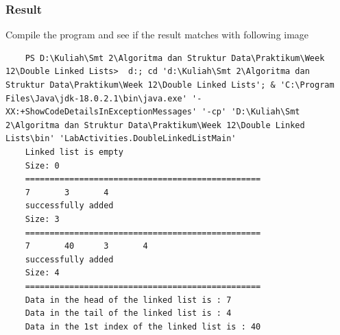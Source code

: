 \documentclass[12pt,titlepage]{article}
\begin{document}
\subsubsection{Result}
Compile the program and see if the result matches with following image
\begin{verbatim}
    PS D:\Kuliah\Smt 2\Algoritma dan Struktur Data\Praktikum\Week 12\Double Linked Lists>  d:; cd 'd:\Kuliah\Smt 2\Algoritma dan Struktur Data\Praktikum\Week 12\Double Linked Lists'; & 'C:\Program Files\Java\jdk-18.0.2.1\bin\java.exe' '-XX:+ShowCodeDetailsInExceptionMessages' '-cp' 'D:\Kuliah\Smt 2\Algoritma dan Struktur Data\Praktikum\Week 12\Double Linked Lists\bin' 'LabActivities.DoubleLinkedListMain' 
    Linked list is empty
    Size: 0
    ================================================
    7       3       4
    successfully added
    Size: 3
    ================================================
    7       40      3       4
    successfully added
    Size: 4
    ================================================
    Data in the head of the linked list is : 7
    Data in the tail of the linked list is : 4
    Data in the 1st index of the linked list is : 40
\end{verbatim}
\end{document}
